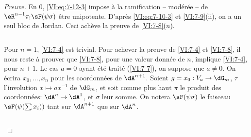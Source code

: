 \documentclass[oneside]{book}
\theoremstyle{sga-source}
\theoremstyle{sga-source-dash}
\theoremstyle{sga-source-dotdash}
\theoremstyle{sga-source-number-note-dash}
\theoremstyle{sga-source-note-number-dotdash}
\theoremstyle{sga-source-example-dotdash}
\theoremstyle{sga-source-inline-number}
\theoremstyle{sga-source-bare-number}
\theoremstyle{sga-source}
\newcommand{\PrintPage}[1]{}\newcommand{\MathPage}[1]{}\newcommand{\PrintCite}[2]{#1}\newcommand{\var}[3]{#1}
\begin{document}
\begin{proof}[Preuve]
En $0$, \eqref{VI:eq:7-12-3} impose à la ramification -- modérée -- de 
\var{$\eR^{n-1} \pi_! \sF(\psi\sigma)$ être unipotente}{$\eR^{n-1} \pi_! \sF(\psi\sigma)$ d'être unipotente}{S45-SOL-0945}. D'après 
\eqref{VI:eq:7-10-3} et \ref{VI:7-9}(ii), on a un seul bloc de Jordan. Ceci 
achève la preuve de \ref{VI:7-8}($n$). 





\PrintPage{225}
\subsection{}\label{VI:7-13}

Pour $n=1$, \ref{VI:7-4} est trivial. Pour achever la preuve de \ref{VI:7-4} et 
\ref{VI:7-8}, il nous reste à prouver que \ref{VI:7-8}, pour une valeur 
donnée de $n$, implique \ref{VI:7-4}, pour $n+1$. Le cas $a=0$ ayant été 
traité (\ref{VI:7-7}), on suppose que $a\ne 0$. On écrira $x_0,\dots,x_n$ pour 
les coordonnées de $\dA^{n+1}$. Soient $g=x_0:V_a\to \dG_m$, $\tau$ 
l'involution $x\mapsto a x^{-1}$ de $\dG_m$, et soit comme plus haut $\pi$ le 
produit des coordonnées: $\dA^n \to \dA^1$, et $\sigma$ leur somme. On 
notera $\sF(\psi\sigma)$ le faisceau $\sF(\psi(\sum x_i))$ tant sur $\dA^{n+1}$ 
que sur $\dA^n$. 





\subsection{}\label{VI:7-14}


\end{proof}
\end{document}
